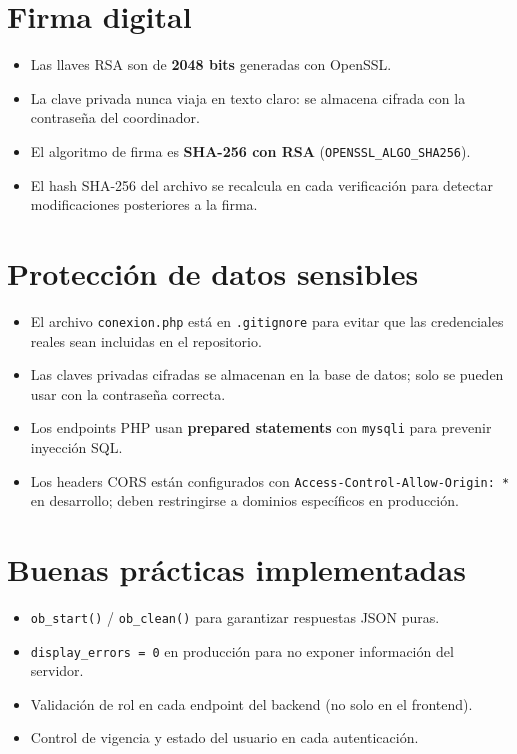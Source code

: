 \documentclass[10pt,letterpaper]{report}
\begin{document}
\section{Firma digital}

\begin{itemize}
  \item Las llaves RSA son de \textbf{2048 bits} generadas con OpenSSL.
  \item La clave privada nunca viaja en texto claro: se almacena cifrada con la contraseña del coordinador.
  \item El algoritmo de firma es \textbf{SHA-256 con RSA} (\texttt{OPENSSL\_ALGO\_SHA256}).
  \item El hash SHA-256 del archivo se recalcula en cada verificación para detectar modificaciones posteriores a la firma.
\end{itemize}

\section{Protección de datos sensibles}

\begin{itemize}
  \item El archivo \texttt{conexion.php} está en \texttt{.gitignore} para evitar que las credenciales reales sean incluidas en el repositorio.
  \item Las claves privadas cifradas se almacenan en la base de datos; solo se pueden usar con la contraseña correcta.
  \item Los endpoints PHP usan \textbf{prepared statements} con \texttt{mysqli} para prevenir inyección SQL.
  \item Los headers CORS están configurados con \texttt{Access-Control-Allow-Origin: *} en desarrollo; deben restringirse a dominios específicos en producción.
\end{itemize}

\section{Buenas prácticas implementadas}

\begin{itemize}
  \item \texttt{ob\_start()} / \texttt{ob\_clean()} para garantizar respuestas JSON puras.
  \item \texttt{display\_errors = 0} en producción para no exponer información del servidor.
  \item Validación de rol en cada endpoint del backend (no solo en el frontend).
  \item Control de vigencia y estado del usuario en cada autenticación.
\end{itemize}
\end{document}
